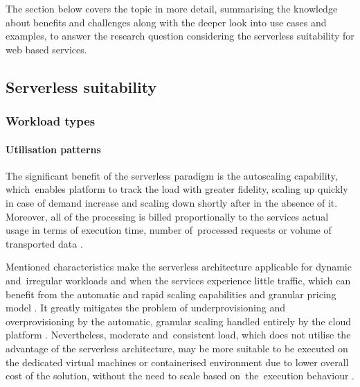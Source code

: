 The section below covers the topic in more detail, summarising the knowledge about benefits and challenges along with the deeper look into use cases and examples, to answer the research question considering the serverless suitability for web based services.

\subsection{Serverless suitability}

\subsubsection{Workload types}

\paragraph{Utilisation patterns} \label{chapter:serverless-suitability-utilisation-patterns}

The significant benefit of the serverless paradigm is the autoscaling capability, which~enables platform to track the load with greater fidelity, scaling up quickly in case of demand increase and scaling down shortly after in the absence of it.
Moreover, all of the processing is billed proportionally to the services actual usage in terms of execution time, number of~processed requests or volume of transported data \cite{BerkeleyServerless}.

Mentioned characteristics make the serverless architecture applicable for dynamic and~irregular workloads and when the services experience little traffic, which can benefit from the automatic and rapid scaling capabilities and granular pricing model \cite{EvaluationOfServerlessApplicationProgrammingModel}.
It greatly mitigates the problem of underprovisioning and overprovisioning by the automatic, granular scaling handled entirely by the cloud platform \cite{MartinFowlerServerless}.
Nevertheless, moderate and~consistent load, which does not utilise the advantage of the serverless architecture, may be more suitable to be executed on the dedicated virtual machines or containerised environment due to lower overall cost of the solution, without the need to scale based on~the~execution behaviour \cite{LeveragingServerlessCloudComputingArchitectures}.

